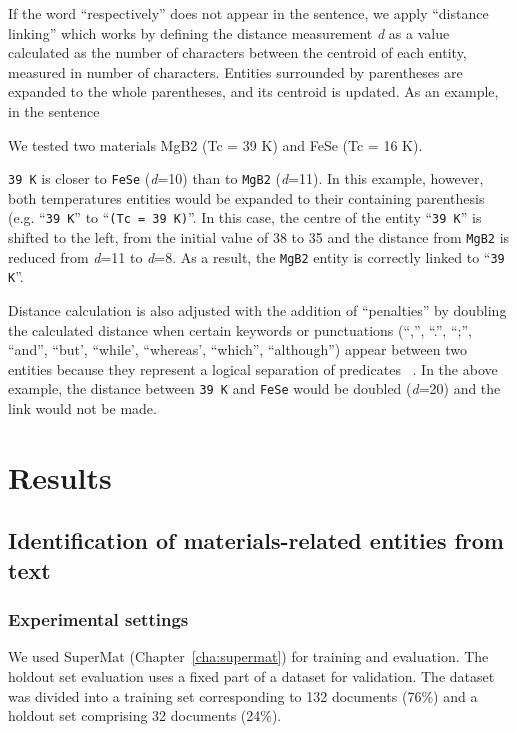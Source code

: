 If the word ``respectively'' does not appear in the sentence, we apply ``distance linking'' which works by defining the distance measurement \textit{d} as a value calculated as the number of characters between the centroid of each entity, measured in number of characters.
Entities surrounded by parentheses are expanded to the whole parentheses, and its centroid is updated.
As an example, in the sentence
\begin{displayquote}
    We tested two materials MgB2 (Tc = 39 K) and FeSe (Tc = 16 K).
\end{displayquote}

\texttt{39 K} is closer to \texttt{FeSe} (\textit{d}=10) than to \texttt{MgB2} (\textit{d}=11). 
In this example, however, both temperatures entities would be expanded to their containing parenthesis (e.g. ``\texttt{39 K}'' to ``\texttt{(Tc = 39 K)}''. 
In this case, the centre of the entity ``\texttt{39 K}'' is shifted to the left, from the initial value of 38 to 35 and the distance from \texttt{MgB2} is reduced from \textit{d}=11 to \textit{d}=8.
As a result, the \texttt{MgB2} entity is correctly linked to ``\texttt{39 K}''.

Distance calculation is also adjusted with the addition of ``penalties'' by doubling the calculated distance when certain keywords or punctuations (``,'', ``.'', ``;'', ``and'', ``but', ``while', ``whereas', ``which'', ``although'') appear between two entities because they represent a logical separation of predicates ~\cite{oka2021table}.
In the above example, the distance between \texttt{39 K} and \texttt{FeSe} would be doubled (\textit{d}=20) and the link would not be made.

\section{Results}

\subsection{Identification of materials-related entities from text}
\subsubsection{Experimental settings}

We used SuperMat (Chapter~\ref{cha:supermat}) for training and evaluation. The holdout set evaluation uses a fixed part of a dataset for validation. 
The dataset was divided into a training set corresponding to 132 documents (76\%) and a holdout set comprising 32 documents (24\%). 


